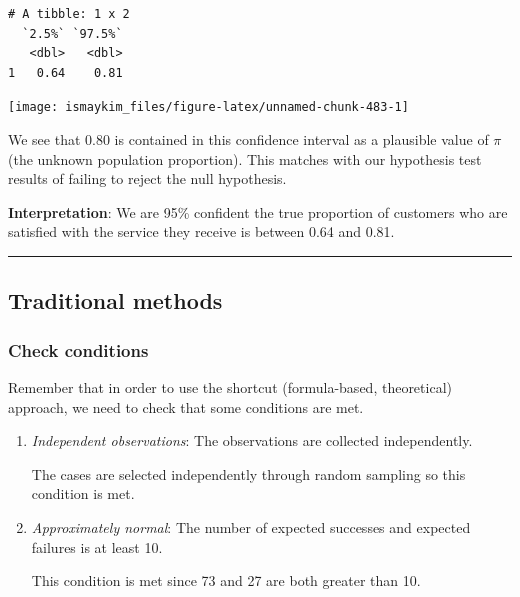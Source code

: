 \documentclass[12pt,]{krantz}
\makeatletter
\newenvironment{Shaded}{\begin{snugshade}}{\end{snugshade}}
\newcommand{\KeywordTok}[1]{\textcolor[rgb]{0.27,0.27,0.27}{\textbf{#1}}}
\newcommand{\DataTypeTok}[1]{\textcolor[rgb]{0.27,0.27,0.27}{#1}}
\newcommand{\StringTok}[1]{\textcolor[rgb]{0.5,0.5,0.5}{#1}}
\newcommand{\OperatorTok}[1]{\textcolor[rgb]{0.43,0.43,0.43}{\textbf{#1}}}
\newcommand{\NormalTok}[1]{#1}
\newenvironment{kframe}{%
\medskip{}
\setlength{\fboxsep}{.8em}
 \def\at@end@of@kframe{}%
 \ifinner\ifhmode%
  \def\at@end@of@kframe{\end{minipage}}%
  \begin{minipage}{\columnwidth}%
 \fi\fi%
 \def\FrameCommand##1{\hskip\@totalleftmargin \hskip-\fboxsep
 \colorbox{shadecolor}{##1}\hskip-\fboxsep
     \hskip-\linewidth \hskip-\@totalleftmargin \hskip\columnwidth}%
 \MakeFramed {\advance\hsize-\width
   \@totalleftmargin\z@ \linewidth\hsize
   \@setminipage}}%
 {\par\unskip\endMakeFramed%
 \at@end@of@kframe}
\renewenvironment{Shaded}{\begin{kframe}}{\end{kframe}}
\makeatother
\begin{document}
\begin{verbatim}
# A tibble: 1 x 2
  `2.5%` `97.5%`
   <dbl>   <dbl>
1   0.64    0.81
\end{verbatim}

\begin{Shaded}
\end{Shaded}

\begin{center}\texttt{[image: ismaykim\_files/figure-latex/unnamed-chunk-483-1]} \end{center}

We see that 0.80 is contained in this confidence interval as a plausible
value of \(\pi\) (the unknown population proportion). This matches with
our hypothesis test results of failing to reject the null hypothesis.

\textbf{Interpretation}: We are 95\% confident the true proportion of
customers who are satisfied with the service they receive is between
0.64 and 0.81.

\begin{center}\rule{0.5\linewidth}{\linethickness}\end{center}

\subsection{Traditional methods}\label{traditional-methods-1}

\subsubsection*{Check conditions}\label{check-conditions-1}


Remember that in order to use the shortcut (formula-based, theoretical)
approach, we need to check that some conditions are met.

\begin{enumerate}
\def\labelenumi{\arabic{enumi}.}
\item
  \emph{Independent observations}: The observations are collected
  independently.

  The cases are selected independently through random sampling so this
  condition is met.
\item
  \emph{Approximately normal}: The number of expected successes and
  expected failures is at least 10.

  This condition is met since 73 and 27 are both greater than 10.
\end{enumerate}
\end{document}
